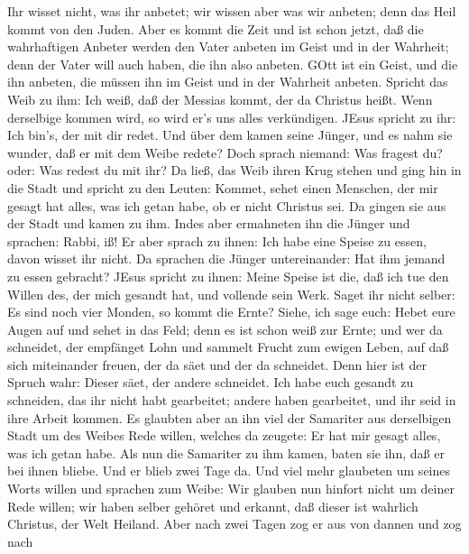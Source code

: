 Ihr wisset nicht, was ihr anbetet; wir wissen aber was wir anbeten; denn
das Heil kommt von den Juden.  Aber es kommt die Zeit und
ist schon jetzt, daß die wahrhaftigen Anbeter werden den Vater anbeten
im Geist und in der Wahrheit; denn der Vater will auch haben, die ihn
also anbeten.  GOtt ist ein Geist, und die ihn anbeten, die
müssen ihn im Geist und in der Wahrheit anbeten.  Spricht
das Weib zu ihm: Ich weiß, daß der Messias kommt, der da Christus heißt.
Wenn derselbige kommen wird, so wird er's uns alles verkündigen.
 JEsus spricht zu ihr: Ich bin's, der mit dir redet.
 Und über dem kamen seine Jünger, und es nahm sie wunder,
daß er mit dem Weibe redete? Doch sprach niemand: Was fragest du? oder:
Was redest du mit ihr?  Da ließ, das Weib ihren Krug stehen
und ging hin in die Stadt und spricht zu den Leuten: 
Kommet, sehet einen Menschen, der mir gesagt hat alles, was ich getan
habe, ob er nicht Christus sei.  Da gingen sie aus der
Stadt und kamen zu ihm.  Indes aber ermahneten ihn die
Jünger und sprachen: Rabbi, iß!  Er aber sprach zu ihnen:
Ich habe eine Speise zu essen, davon wisset ihr nicht.  Da
sprachen die Jünger untereinander: Hat ihm jemand zu essen gebracht?
 JEsus spricht zu ihnen: Meine Speise ist die, daß ich tue
den Willen des, der mich gesandt hat, und vollende sein Werk.
 Saget ihr nicht selber: Es sind noch vier Monden, so kommt
die Ernte? Siehe, ich sage euch: Hebet eure Augen auf und sehet in das
Feld; denn es ist schon weiß zur Ernte;  und wer da
schneidet, der empfänget Lohn und sammelt Frucht zum ewigen Leben, auf
daß sich miteinander freuen, der da säet und der da schneidet.
 Denn hier ist der Spruch wahr: Dieser säet, der andere
schneidet.  Ich habe euch gesandt zu schneiden, das ihr
nicht habt gearbeitet; andere haben gearbeitet, und ihr seid in ihre
Arbeit kommen.  Es glaubten aber an ihn viel der Samariter
aus derselbigen Stadt um des Weibes Rede willen, welches da zeugete: Er
hat mir gesagt alles, was ich getan habe.  Als nun die
Samariter zu ihm kamen, baten sie ihn, daß er bei ihnen bliebe. Und er
blieb zwei Tage da.  Und viel mehr glaubeten um seines
Worts willen  und sprachen zum Weibe: Wir glauben nun
hinfort nicht um deiner Rede willen; wir haben selber gehöret und
erkannt, daß dieser ist wahrlich Christus, der Welt Heiland.
 Aber nach zwei Tagen zog er aus von dannen und zog nach
